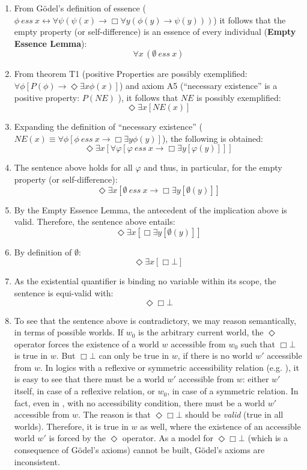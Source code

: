 \documentclass{article}
\newcommand{\imp}{{\rightarrow}}
\newcommand{\biimp}{\leftrightarrow}
\newcommand{\allq}{\forall}
\newcommand{\exq}{\exists}
\newcommand{\Dia}{\Diamond} %
\newcommand{\NE}{\mathit{NE}}
\newcommand{\ess}[2]{#1\ \mathit{ess}\ #2}
\newcommand{\nec}{\Box}
\newcommand{\pos}{\Dia}
\begin{document}
\begin{enumerate}
\item From G\"odel's definition of essence 
(${\ess{\phi}{x} \biimp {\allq \psi} (\psi(x)
\imp {\nec} \allq y (\phi(y) \imp \psi(y)))}$) it follows that the
empty property (or self-difference) is an essence of every individual (\textbf{Empty Essence Lemma}): 
$$\allq x\,(\ess{\emptyset}{x})$$

\item From theorem T1 (positive Properties are possibly
  exemplified: ${\allq \phi} [P(\phi) \imp {\pos}  \exq x
  \phi(x)]$) and axiom A5 (``necessary existence'' is a positive property: $P(\NE)$ ), it follows that $\NE$ is possibly exemplified:
  $$
  \pos \exq x [\NE(x)]
  $$
 
\item Expanding the definition of ``necessary existence''
  (${\NE(x) \equiv \allq \phi [\ess{\phi}{x} \imp \nec \exq y
    \phi(y)]}$), the following is obtained:
  $$
  \pos \exq x [\allq \varphi [ \ess{\varphi}{x} \imp \nec \exq y [\varphi(y)] ] ]
  $$

\item The sentence above holds for all $\varphi$ and thus, in
  particular, for the empty property (or self-difference):
$$
\pos \exq x [ \ess{\emptyset}{x} \imp \nec \exq y [\emptyset(y)] ]
$$

\item By the Empty Essence Lemma, the antecedent of the implication above is valid. Therefore, the sentence above entails:
$$
\pos \exq x [ \nec \exq y [\emptyset(y)] ]
$$ 

\item By definition of $\emptyset$: 
$$
\pos \exq x [ \nec \bot ]
$$

\item As the existential quantifier is binding no variable within its scope, the sentence is equi-valid with:
$$\pos \nec \bot $$

\item To see that the sentence above is contradictory, we may reason semantically, in terms of possible worlds. If $w_0$ is the arbitrary current world, the $\pos$ operator forces the existence of a world $w$ accessible from $w_0$ such that $\nec \bot$ is true in $w$. But $\nec \bot$ can only be true in $w$, if there is no world $w'$ accessible from $w$. In logics with a reflexive or symmetric accessibility relation (e.g. \KB), it is easy to see that there must be a world $w'$ accessible from $w$: either $w'$ itself, in case of a reflexive relation, or $w_0$, in case of a symmetric relation. In fact, even in \K, with no accessibility condition, there must be a world $w'$ accessible from $w$. The reason is that $\pos \nec \bot$ should be \emph{valid} (true in all worlds). Therefore, it is true in $w$ as well, where the existence of an accessible world $w'$ is forced by the $\pos$ operator. As a model for $\pos \nec \bot$ (which is a consequence of G\"odel's axioms) cannot be built, G\"odel's axioms are inconsistent.
\end{enumerate}
\end{document}
